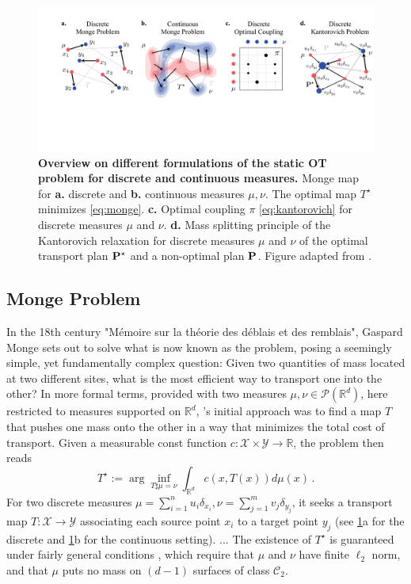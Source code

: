\begin{figure}[t]
  \includegraphics[width=\textwidth]{figures/fig_ot_background.pdf}
  \caption{\textbf{Overview on different formulations of the static OT problem for discrete and continuous measures.} Monge map for \textbf{a.} discrete and \textbf{b.} continuous measures $\mu, \nu$. The optimal map $T^\star$ minimizes \eqref{eq:monge}. \textbf{c.} Optimal coupling $\pi$ \eqref{eq:kantorovich} for discrete measures $\mu$ and $\nu$. \textbf{d.} Mass splitting principle of the Kantorovich relaxation for discrete measures $\mu$ and $\nu$ of the optimal transport plan $\mathbf{P}^\star$ and a non-optimal plan $\mathbf{P}$. Figure adapted from \citet{peyre2019computational}.}	
  \label{fig:ot_principles}
\end{figure}

\subsection{Monge Problem} \label{sec:background_monge}

In the 18th century "M{\'e}moire sur la th{\'e}orie des d{\'e}blais et des remblais", Gaspard Monge sets out to solve what is now known as the \citeauthor{monge1781histoire} problem, posing a seemingly simple, yet fundamentally complex question: Given two quantities of mass located at two different sites, what is the most efficient way to transport one into the other?
In more formal terms, provided with two measures $\mu, \nu\in \mathcal{P}(\mathbb{R}^d)$, here restricted to measures supported on $\mathbb{R}^d$, \citeauthor{monge1781histoire}'s initial approach was to find a map $T$ that pushes one mass onto the other in a way that minimizes the total cost of transport.
Given a measurable const function $c: \mathcal{X} \times \mathcal{Y} \rightarrow \mathbb{R}$, the \citeauthor{monge1781histoire} problem then reads
\begin{equation}\label{eq:monge}
T^\star := \arg\inf_{T\sharp\mu=\nu}\int_{\mathbb{R}^d} c(x, T(x)) d\mu(x)\,.
\end{equation}
For two discrete measures $\mu=\sum_{i=1}^n u_i \delta_{x_{i}}, \nu=\sum_{j=1}^m v_j \delta_{y_{j}}$, it seeks a transport map $T: \mathcal{X} \rightarrow \mathcal{Y}$ associating each source point $x_i$ to a target point $y_j$ (see \cref{fig:ot_principles}a for the discrete and \cref{fig:ot_principles}b for the continuous setting).
... %
The existence of $T^\star$ is guaranteed under fairly general conditions \citep[Theorem 1.22]{santambrogio2015optimal}, which require that $\mu$ and $\nu$ have finite $\ell_2$ norm, and that $\mu$ puts no mass on $(d-1)$ surfaces of class $\mathcal{C}_2$.


